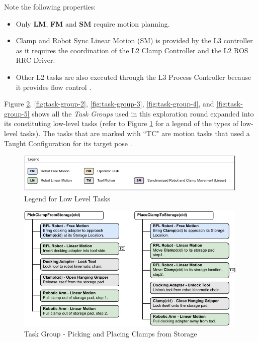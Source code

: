 Note the following properties:

\begin{itemize}
	\item Only \textbf{LM}, \textbf{FM }and \textbf{SM }require motion planning. 

	\item Clamp and Robot Sync Linear Motion (SM) is provided by the L3 controller as it requires the coordination of the L2 Clamp Controller and the L2 ROS RRC Driver. 

	\item Other L2 tasks are also executed through the L3 Process Controller because it provides flow control . 

\end{itemize}
Figure \ref{fig:task-group-1}, \ref{fig:task-group-2}, \ref{fig:task-group-3}, \ref{fig:task-group-4}, and \ref{fig:task-group-5} shows all the \textit{Task Groups} used in this exploration round expanded into its constituting low-level tasks (refer to Figure \ref{fig:legend-for-low-level-tasks} for a legend of the types of low-level tasks). The tasks that are marked with ``TC" are motion tasks that used a Taught Configuration for its target pose .

\begin{figure}[!h]
    \centering
    \includegraphics[width=0.99\textwidth]{images/6a/motion-legend.pdf}
    \caption{Legend for Low Level Tasks}
    \label{fig:legend-for-low-level-tasks}
\end{figure}

\begin{figure}[!p]
    \centering
    \includegraphics[width=0.99\textwidth]{images/6a/lowleveltask-1.pdf}
    \caption{Task Group - Picking and Placing Clamps from Storage}
    \label{fig:task-group-1}
\end{figure}

